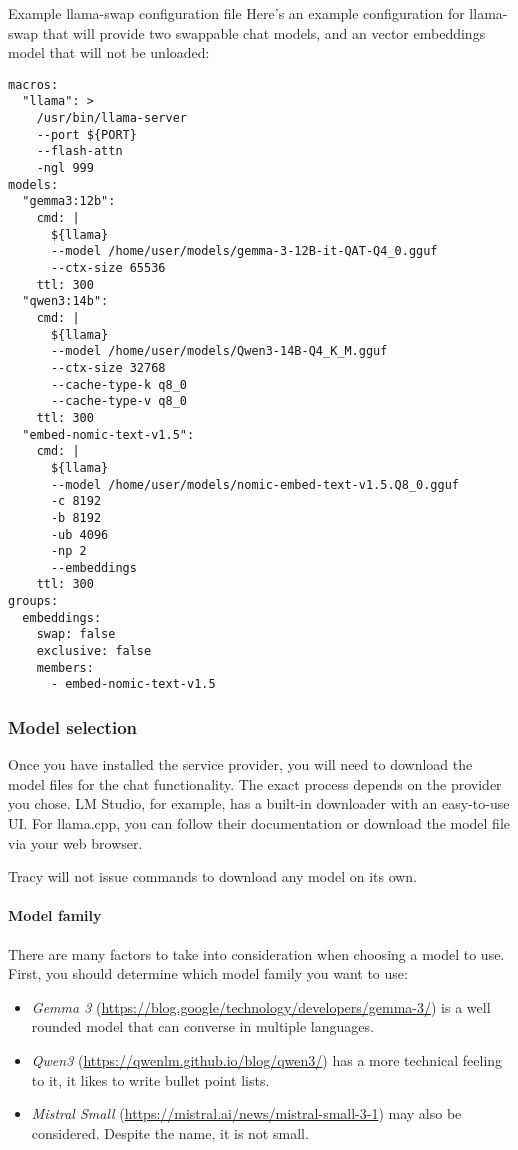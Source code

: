 \documentclass[hidelinks,titlepage,a4paper,twoside]{article}
\begin{document}
\begin{bclogo}[
noborder=true,
couleur=black!5,
logo=\bclampe
]{Example llama-swap configuration file}
Here's an example configuration for llama-swap that will provide two swappable chat models, and an vector embeddings model that will not be unloaded:

\begin{lstlisting}
macros:
  "llama": >
    /usr/bin/llama-server
    --port ${PORT}
    --flash-attn
    -ngl 999
models:
  "gemma3:12b":
    cmd: |
      ${llama}
      --model /home/user/models/gemma-3-12B-it-QAT-Q4_0.gguf
      --ctx-size 65536
    ttl: 300
  "qwen3:14b":
    cmd: |
      ${llama}
      --model /home/user/models/Qwen3-14B-Q4_K_M.gguf
      --ctx-size 32768
      --cache-type-k q8_0
      --cache-type-v q8_0
    ttl: 300
  "embed-nomic-text-v1.5":
    cmd: |
      ${llama}
      --model /home/user/models/nomic-embed-text-v1.5.Q8_0.gguf
      -c 8192
      -b 8192
      -ub 4096
      -np 2
      --embeddings
    ttl: 300
groups:
  embeddings:
    swap: false
    exclusive: false
    members:
      - embed-nomic-text-v1.5
\end{lstlisting}
\end{bclogo}

\subsubsection{Model selection}

Once you have installed the service provider, you will need to download the model files for the chat functionality. The exact process depends on the provider you chose. LM Studio, for example, has a built-in downloader with an easy-to-use UI. For llama.cpp, you can follow their documentation or download the model file via your web browser.

Tracy will not issue commands to download any model on its own.

\paragraph{Model family}

There are many factors to take into consideration when choosing a model to use. First, you should determine which model family you want to use:

\begin{itemize}
\item \emph{Gemma 3} (\url{https://blog.google/technology/developers/gemma-3/}) is a well rounded model that can converse in multiple languages. 
\item \emph{Qwen3} (\url{https://qwenlm.github.io/blog/qwen3/}) has a more technical feeling to it, it likes to write bullet point lists.
\item \emph{Mistral Small} (\url{https://mistral.ai/news/mistral-small-3-1}) may also be considered. Despite the name, it is not small.
\end{itemize}
\end{document}
